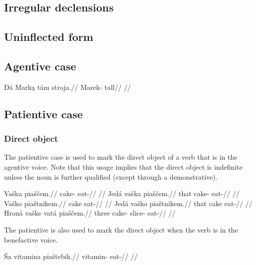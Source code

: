 \subsection{Irregular declensions}

\subsection{Uninflected form}


\subsection{Agentive case}

\pex
\begingl
\gla Dá Mark\k{a} tám stroja.//
\glb {} Marek-  tall//
\glft {}//
\endgl
\xe


\subsection{Patientive case}

\subsubsection{Direct object}
The patientive case is used to mark the direct object of a verb that is in the agentive voice. Note that this usage implies that the direct object is indefinite unless the noun is further qualified (except through a demonstrative).

\pex
\a
\begingl
\gla Vaška piaščem.//
\glb cake- eat-//
\glft {}//
\endgl
\a
\begingl
\gla Jedá vaška piaščem.//
\glb that cake- eat-//
\glft {}//
\endgl
\a
\begingl
\gla Vaško piaštnikem.//
\glb cake eat-//
\glft {}//
\endgl
\a
\begingl
\gla Jedá vaško piaštnikem.//
\glb that cake eat-//
\glft {}//
\endgl
\a
\begingl
\gla Hroná vaške vatá piaščem.//
\glb three cake- slice- eat-//
\glft {}//
\endgl
\xe

The patientive is also used to mark the direct object when the verb is in the benefactive voice.

\pex
\begingl
\gla Ša vitamina piaštebik.//
\glb {} vitamin- eat-//
\glft {}//
\endgl
\xe

